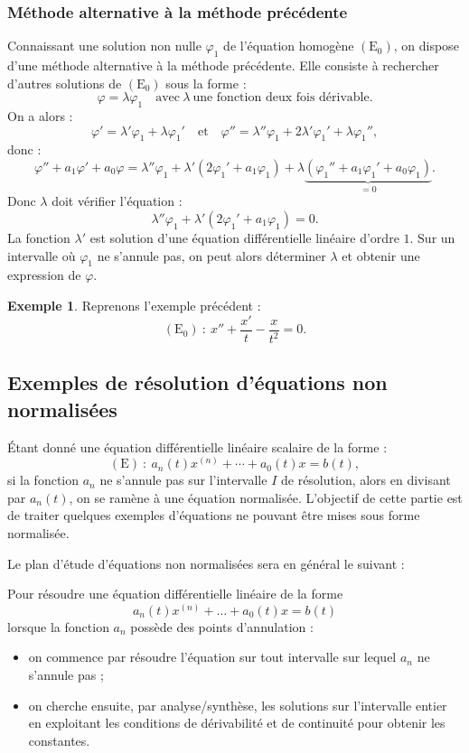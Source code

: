 \documentclass[french]{article}
\theoremstyle{plain}
\theoremstyle{definition}
\newtheorem*{ex}{Exemple}
\theoremstyle{remark}
\begin{document}
\subsubsection*{Méthode alternative à la méthode précédente}

Connaissant une solution non nulle $\varphi_1$ de l'équation homogène $(\text{E}_0)$, on dispose d'une méthode alternative à la méthode précédente. Elle consiste à rechercher d'autres solutions de $(\text{E}_0)$ sous la forme :
$$\varphi=\lambda\varphi_1\quad\text{avec}\ \lambda\ \text{une fonction deux fois dérivable.}$$
On a alors :
$$\varphi'=\lambda'\varphi_1+\lambda\varphi_1'\quad\text{et}\quad\varphi''=\lambda''\varphi_1+2\lambda'\varphi_1'+\lambda\varphi_1'',$$ donc :
$$\varphi''+a_1\varphi'+a_0\varphi=\lambda''\varphi_1+\lambda'(2\varphi_1'+a_1\varphi_1)+\lambda\underbrace{(\varphi_1''+a_1\varphi_1'+a_0\varphi_1)}_{=0}.$$
Donc $\lambda$ doit vérifier l'équation :
$$\lambda''\varphi_1+\lambda'(2\varphi_1'+a_1\varphi_1)=0.$$
La fonction $\lambda'$ est solution d'une équation différentielle linéaire d'ordre $1$. Sur un intervalle où $\varphi_1$ ne s'annule pas, on peut alors déterminer $\lambda$ et obtenir une expression de $\varphi$.

\begin{ex}
	Reprenons l'exemple précédent :
	$$(\text{E}_0)\ :\ x''+\frac{x'}{t}-\frac{x}{t^2}=0.$$
\end{ex}

\subsection{Exemples de résolution d'équations non normalisées}

Étant donné une équation différentielle linéaire scalaire de la forme :
$$(\text{E})\ :\ a_n(t)x^{(n)}+\cdots+a_0(t)x=b(t),$$ si la fonction $a_n$ ne s'annule pas sur l'intervalle $I$ de résolution, alors en divisant par $a_n(t)$, on se ramène à une équation normalisée. L'objectif de cette partie est de traiter quelques exemples d'équations ne pouvant être mises sous forme normalisée.

Le plan d'étude d'équations non normalisées sera en général le suivant :

\begin{met}
	Pour résoudre une équation différentielle linéaire de la forme $$a_n(t)x^{(n)}+\ldots+a_0(t)x=b(t)$$ lorsque la fonction $a_n$ possède des points d'annulation :
	\begin{itemize}
		\item on commence par résoudre l'équation sur tout intervalle sur lequel $a_n$ ne s'annule pas ;
		\item on cherche ensuite, par analyse/synthèse, les solutions sur l'intervalle entier en exploitant les conditions de dérivabilité et de continuité pour obtenir les constantes.
	\end{itemize}
\end{met}
\end{document}
